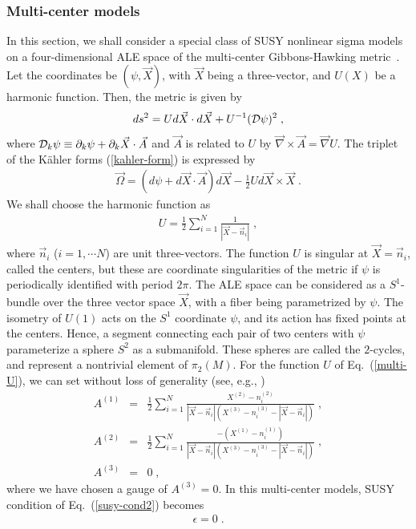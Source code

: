 \documentclass[a4paper,12pt]{article}
\newcommand{\kahler}{K\"{a}hler }
\begin{document}
\subsubsection{Multi-center models}
In this section, 
we shall consider a special class of SUSY nonlinear 
sigma models on a four-dimensional ALE space of the multi-center 
Gibbons-Hawking metric~\cite{GH}. 
Let the coordinates be $(\psi,\vec{X})$, 
with $\vec{X}$ being a three-vector, 
and $U(X)$ be a harmonic function. 
Then, the metric is given by 
\begin{eqnarray}
  ds^2 = Ud\vec{X}\cdot d\vec{X}+U^{-1}({\cal D}\psi)^2\;,
\end{eqnarray}
where ${\cal D}_k\psi\equiv \partial_k\psi 
+ \partial_k\vec{X}\cdot \vec{A}$ 
and $\vec{A}$ is related to $U$ by 
$\vec{\nabla}\times \vec{A}=\vec{\nabla}U$.
The triplet of the \kahler forms (\ref{kahler-form}) 
is expressed by 
\begin{eqnarray}
  \vec{\Omega}=(d\psi+d\vec{X}\cdot\vec{A})d\vec{X}
                -\frac{1}{2}Ud\vec{X}\times \vec{X} \;. 
\end{eqnarray}
We shall choose the harmonic function as 
\begin{eqnarray}
  U=\frac{1}{2}\sum^N_{i=1}\frac{1}{|\vec{X}-\vec{n}_i|} \;,
  \label{multi-U}
\end{eqnarray}
where $\vec{n}_i$ ($i=1,\cdots N$) are unit three-vectors. 
The function $U$ is singular at $\vec{X}=\vec{n}_i$, 
called the centers, 
but these are coordinate singularities of the metric
if $\psi$ is periodically identified with period $2\pi$. 
The ALE space can be considered as a $S^1$-bundle over 
the three vector space $\vec{X}$, 
with a fiber being parametrized by $\psi$. 
The isometry of $U(1)$ acts on the $S^1$ coordinate $\psi$,
and its action has fixed points at the centers.
Hence, a segment connecting each pair of two centers 
with $\psi$ parameterize a sphere $S^2$ as a submanifold. 
These spheres are called the $2$-cycles, 
and represent a nontrivial element of $\pi_2(M)$. 
For the function $U$ of Eq.~(\ref{multi-U}), 
we can set without loss of generality 
(see, e.g., \cite{NOY})
\begin{eqnarray}
 A^{(1)} 
  &=& \frac{1}{2}\sum_{i=1}^N \frac{X^{(2)}-n^{(2)}_i}
     {|\vec{X}-\vec{n}_i|(X^{(3)}-n^{(3)}_i-|\vec{X}-\vec{n}_i|)}
             \;, \nonumber \\
 A^{(2)} 
  &=& \frac{1}{2}\sum_{i=1}^N \frac{-(X^{(1)}-n^{(1)}_i)}
      {|\vec{X}-\vec{n}_i|(X^{(3)}-n^{(3)}_i-|\vec{X}-\vec{n}_i|)}
             \;, \nonumber \\
  A^{(3)} &=& 0 \;,
  \label{multi-A}
\end{eqnarray}
where we have chosen a gauge of $A^{(3)}=0$. 
In this multi-center models, SUSY condition of Eq.~(\ref{susy-cond2})
 becomes
\begin{eqnarray}
  [ \Gamma^m\vec{\sigma}\cdot \partial_m\vec{X}
     +iU^{-1}\Gamma^m{\cal D}_m\psi ] \epsilon = 0 \;. 
\label{SUSY-EH}
\end{eqnarray}
\end{document}
